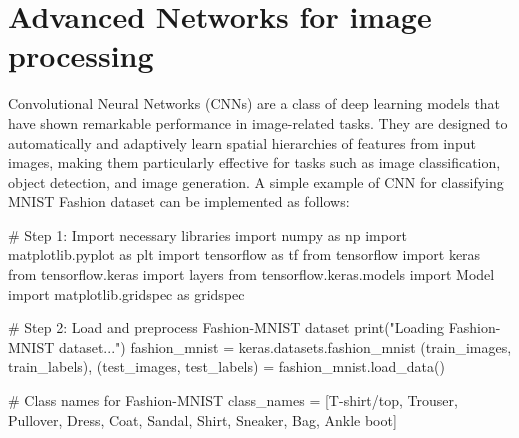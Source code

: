 \documentclass[
  letterpaper,
  DIV=11,
  numbers=noendperiod]{scrreprt}
\newenvironment{Shaded}{\begin{snugshade}}{\end{snugshade}}
\newcommand{\BuiltInTok}[1]{\textcolor[rgb]{0.00,0.23,0.31}{#1}}
\newcommand{\CommentTok}[1]{\textcolor[rgb]{0.37,0.37,0.37}{#1}}
\newcommand{\ImportTok}[1]{\textcolor[rgb]{0.00,0.46,0.62}{#1}}
\newcommand{\NormalTok}[1]{\textcolor[rgb]{0.00,0.23,0.31}{#1}}
\newcommand{\OperatorTok}[1]{\textcolor[rgb]{0.37,0.37,0.37}{#1}}
\newcommand{\StringTok}[1]{\textcolor[rgb]{0.13,0.47,0.30}{#1}}
\begin{document}
\section{Advanced Networks for image
processing}\label{advanced-networks-for-image-processing}

Convolutional Neural Networks (CNNs) are a class of deep learning models
that have shown remarkable performance in image-related tasks. They are
designed to automatically and adaptively learn spatial hierarchies of
features from input images, making them particularly effective for tasks
such as image classification, object detection, and image generation. A
simple example of CNN for classifying MNIST Fashion dataset can be
implemented as follows:

\begin{Shaded}
\begin{Highlighting}[]
\CommentTok{\# Step 1: Import necessary libraries}
\ImportTok{import}\NormalTok{ numpy }\ImportTok{as}\NormalTok{ np}
\ImportTok{import}\NormalTok{ matplotlib.pyplot }\ImportTok{as}\NormalTok{ plt}
\ImportTok{import}\NormalTok{ tensorflow }\ImportTok{as}\NormalTok{ tf}
\ImportTok{from}\NormalTok{ tensorflow }\ImportTok{import}\NormalTok{ keras}
\ImportTok{from}\NormalTok{ tensorflow.keras }\ImportTok{import}\NormalTok{ layers}
\ImportTok{from}\NormalTok{ tensorflow.keras.models }\ImportTok{import}\NormalTok{ Model}
\ImportTok{import}\NormalTok{ matplotlib.gridspec }\ImportTok{as}\NormalTok{ gridspec}

\CommentTok{\# Step 2: Load and preprocess Fashion{-}MNIST dataset}
\BuiltInTok{print}\NormalTok{(}\StringTok{"Loading Fashion{-}MNIST dataset..."}\NormalTok{)}
\NormalTok{fashion\_mnist }\OperatorTok{=}\NormalTok{ keras.datasets.fashion\_mnist}
\NormalTok{(train\_images, train\_labels), (test\_images, test\_labels) }\OperatorTok{=}\NormalTok{ fashion\_mnist.load\_data()}

\CommentTok{\# Class names for Fashion{-}MNIST}
\NormalTok{class\_names }\OperatorTok{=}\NormalTok{ [}\StringTok{\textquotesingle{}T{-}shirt/top\textquotesingle{}}\NormalTok{, }\StringTok{\textquotesingle{}Trouser\textquotesingle{}}\NormalTok{, }\StringTok{\textquotesingle{}Pullover\textquotesingle{}}\NormalTok{, }\StringTok{\textquotesingle{}Dress\textquotesingle{}}\NormalTok{, }\StringTok{\textquotesingle{}Coat\textquotesingle{}}\NormalTok{,}
               \StringTok{\textquotesingle{}Sandal\textquotesingle{}}\NormalTok{, }\StringTok{\textquotesingle{}Shirt\textquotesingle{}}\NormalTok{, }\StringTok{\textquotesingle{}Sneaker\textquotesingle{}}\NormalTok{, }\StringTok{\textquotesingle{}Bag\textquotesingle{}}\NormalTok{, }\StringTok{\textquotesingle{}Ankle boot\textquotesingle{}}\NormalTok{]}


\end{Highlighting}
\end{Shaded}
\end{document}
